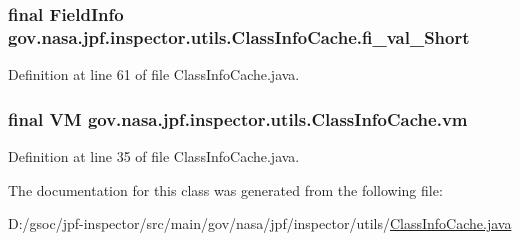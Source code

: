 \subsubsection[{\texorpdfstring{fi\+\_\+val\+\_\+\+Short}{fi_val_Short}}]{\setlength{\rightskip}{0pt plus 5cm}final Field\+Info gov.\+nasa.\+jpf.\+inspector.\+utils.\+Class\+Info\+Cache.\+fi\+\_\+val\+\_\+\+Short}\hypertarget{classgov_1_1nasa_1_1jpf_1_1inspector_1_1utils_1_1_class_info_cache_afc6220bf5fcb698600f2865239641fab}{}\label{classgov_1_1nasa_1_1jpf_1_1inspector_1_1utils_1_1_class_info_cache_afc6220bf5fcb698600f2865239641fab}


Definition at line 61 of file Class\+Info\+Cache.\+java.

\subsubsection[{\texorpdfstring{vm}{vm}}]{\setlength{\rightskip}{0pt plus 5cm}final VM gov.\+nasa.\+jpf.\+inspector.\+utils.\+Class\+Info\+Cache.\+vm\hspace{0.3cm}{\ttfamily [private]}}\hypertarget{classgov_1_1nasa_1_1jpf_1_1inspector_1_1utils_1_1_class_info_cache_a4d8d22b70b147daca18b19bff668882b}{}\label{classgov_1_1nasa_1_1jpf_1_1inspector_1_1utils_1_1_class_info_cache_a4d8d22b70b147daca18b19bff668882b}


Definition at line 35 of file Class\+Info\+Cache.\+java.



The documentation for this class was generated from the following file\+:\begin{DoxyCompactItemize}
\item 
D\+:/gsoc/jpf-\/inspector/src/main/gov/nasa/jpf/inspector/utils/\hyperlink{_class_info_cache_8java}{Class\+Info\+Cache.\+java}\end{DoxyCompactItemize}
